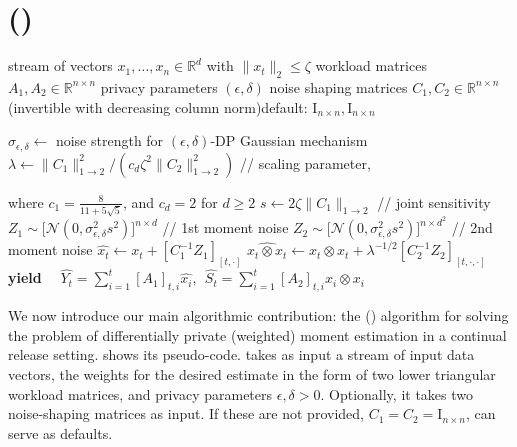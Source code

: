 \section{\method (\acronym)}\label{sec:method}

\begin{algorithm}[t]
\caption{\method (\acronym)}\label{alg:JME}
\begin{algorithmic}
\INPUT stream of vectors $x_1, \dots, x_n\in \mathbb{R}^d$ with \mbox{$\|x_t\|_2 \leq \zeta$} %
\INPUT workload matrices $A_1, A_2\in \mathbb{R}^{n \times n}$
\INPUT privacy parameters $(\epsilon,\delta)$
\INPUT noise shaping matrices $C_1, C_2\in\mathbb{R}^{n \times n}$ (invertible with decreasing column norm)\quad default: $\text{I}_{n\times n},\text{I}_{n\times n}$

\smallskip
\STATE $\sigma_{\epsilon, \delta}\leftarrow$ noise strength for $(\epsilon,\delta)$-DP Gaussian mechanism
\STATE $\lambda\leftarrow \|C_1\|_{1\to 2}^2/(c_d\zeta^2\|C_2\|_{1 \to 2}^2)$ \hfill// scaling parameter, 

\qquad where $c_1=\frac{8}{11 + 5\sqrt{5}}$, and $c_d = 2$ for $d\geq 2$
\STATE $s\leftarrow 2\zeta \|C_1\|_{1 \to 2}$ \hfill// joint sensitivity
\STATE $Z_1\sim \big[\mathcal{N}(0, \sigma_{\epsilon, \delta}^2 s^2) \big]^{n\times d}$ \hfill// 1st moment noise
\STATE $Z_2\sim \big[\mathcal{N}(0, \sigma_{\epsilon, \delta}^2 s^2)
\big]^{n\times d^2}$ \hfill// 2nd moment noise 
\smallskip
{}
\STATE $\widehat{x_t} \leftarrow x_t +  [C_{1}^{-1}Z_1]_{[t,\cdot]}$
\STATE $\widehat{x_t \otimes x_t} \leftarrow x_t \otimes x_t + \lambda^{-1/2}[C_{2}^{-1}Z_2]_{[t,\cdot,\cdot]}$
\STATE \textbf{yield} \ \ $\widehat{Y_t}=\sum\limits_{i = 1}^{t} [A_1]_{t,i}\widehat{x_i}, \ \ \widehat{S_t}=\sum\limits_{i = 1}^{t} [A_2]_{t,i} \widehat{x_i \otimes x_i}$  
\ENDFOR
\end{algorithmic}
\end{algorithm}

We now introduce our main algorithmic contribution: the \method (\acronym) algorithm for solving the problem of differentially private (weighted) moment estimation in a continual release setting. 
%
 shows its pseudo-code. 
%
\acronym takes as input a stream of input data vectors, the weights for the desired estimate in the form of two lower triangular workload matrices, and privacy parameters $\epsilon,\delta>0$.
%
Optionally, it takes two noise-shaping matrices as input.
%
If these are not provided, $C_1=C_2=\text{I}_{n\times n}$, can serve as defaults. 

